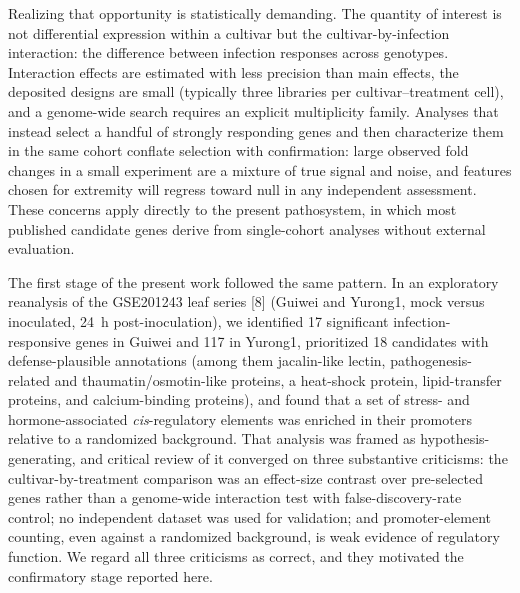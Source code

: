 \documentclass[11pt]{article}
\begin{document}
Realizing that opportunity is statistically demanding. The quantity of interest is not differential expression within a cultivar but the cultivar-by-infection interaction: the difference between infection responses across genotypes. Interaction effects are estimated with less precision than main effects, the deposited designs are small (typically three libraries per cultivar--treatment cell), and a genome-wide search requires an explicit multiplicity family. Analyses that instead select a handful of strongly responding genes and then characterize them in the same cohort conflate selection with confirmation: large observed fold changes in a small experiment are a mixture of true signal and noise, and features chosen for extremity will regress toward null in any independent assessment. These concerns apply directly to the present pathosystem, in which most published candidate genes derive from single-cohort analyses without external evaluation.

The first stage of the present work followed the same pattern. In an exploratory reanalysis of the GSE201243 leaf series [8] (Guiwei and Yurong1, mock versus inoculated, 24~h post-inoculation), we identified 17 significant infection-responsive genes in Guiwei and 117 in Yurong1, prioritized 18 candidates with defense-plausible annotations (among them jacalin-like lectin, pathogenesis-related and thaumatin/osmotin-like proteins, a heat-shock protein, lipid-transfer proteins, and calcium-binding proteins), and found that a set of stress- and hormone-associated \textit{cis}-regulatory elements was enriched in their promoters relative to a randomized background. That analysis was framed as hypothesis-generating, and critical review of it converged on three substantive criticisms: the cultivar-by-treatment comparison was an effect-size contrast over pre-selected genes rather than a genome-wide interaction test with false-discovery-rate control; no independent dataset was used for validation; and promoter-element counting, even against a randomized background, is weak evidence of regulatory function. We regard all three criticisms as correct, and they motivated the confirmatory stage reported here.
\end{document}
